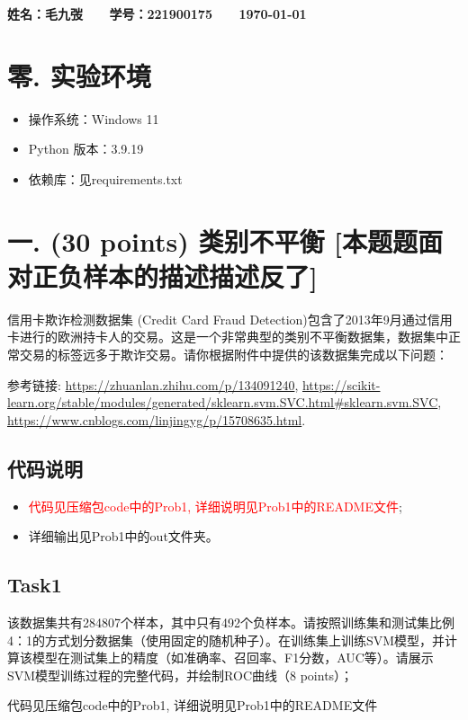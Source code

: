 \documentclass[8pt]{article}
\begin{document}
\textbf{\color{blue} \Large 姓名：毛九弢 \ \ \ 学号：221900175 \ \ \ \today}

\section*{零. 实验环境}
\begin{itemize}
    \item 操作系统：Windows 11
    \item Python 版本：3.9.19
    \item 依赖库：见requirements.txt
\end{itemize}

\section*{一. (30 points) 类别不平衡 [本题题面对正负样本的描述描述反了]}

信用卡欺诈检测数据集 (Credit Card Fraud Detection)包含了2013年9月通过信用卡进行的欧洲持卡人的交易。这是一个非常典型的类别不平衡数据集，数据集中正常交易的标签远多于欺诈交易。请你根据附件中提供的该数据集完成以下问题：

参考链接: 
\url{https://zhuanlan.zhihu.com/p/134091240},
\url{https://scikit-learn.org/stable/modules/generated/sklearn.svm.SVC.html#sklearn.svm.SVC},
\url{https://www.cnblogs.com/linjingyg/p/15708635.html}.

\subsection*{代码说明}
\begin{itemize}
    \item \textcolor{red}{代码见压缩包code中的Prob1, 详细说明见Prob1中的README文件}; 
    \item 详细输出见Prob1中的out文件夹。
\end{itemize}

\subsection*{Task1}
该数据集共有284807个样本，其中只有492个负样本。请按照训练集和测试集比例4：1的方式划分数据集（使用固定的随机种子）。在训练集上训练SVM模型，并计算该模型在测试集上的精度（如准确率、召回率、F1分数，AUC等）。请展示SVM模型训练过程的完整代码，并绘制ROC曲线（8 points）；

{代码见压缩包code中的Prob1, 详细说明见Prob1中的README文件}
\end{document}
